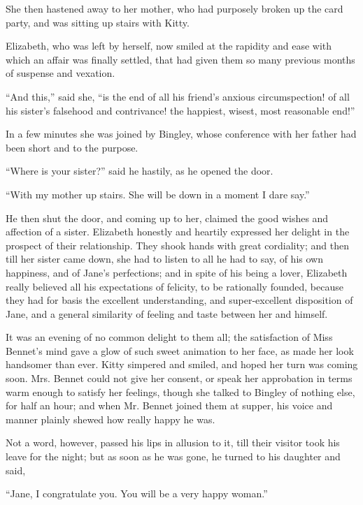 She then hastened away to her mother, who had purposely
broken up the card party, and was sitting up stairs
with Kitty.

Elizabeth, who was left by herself, now smiled at the
rapidity and ease with which an affair was finally settled,
that had given them so many previous months of suspense
and vexation.

“And this,” said she, “is the end of all his friend’s
anxious circumspection! of all his sister’s falsehood
and contrivance! the happiest, wisest, most reasonable
end!”

In a few minutes she was joined by Bingley, whose
conference with her father had been short and to the
purpose.

“Where is your sister?” said he hastily, as he opened
the door.

“With my mother up stairs. She will be down in a
moment I dare say.”

He then shut the door, and coming up to her, claimed
the good wishes and affection of a sister. Elizabeth
honestly and heartily expressed her delight in the prospect
of their relationship. They shook hands with great
cordiality; and then till her sister came down, she had
to listen to all he had to say, of his own happiness, and
of Jane’s perfections; and in spite of his being a lover,
Elizabeth really believed all his expectations of felicity,
to be rationally founded, because they had for basis the
excellent understanding, and super-excellent disposition
of Jane, and a general similarity of feeling and taste
between her and himself.

It was an evening of no common delight to them all;
the satisfaction of Miss Bennet’s mind gave a glow of
such sweet animation to her face, as made her look handsomer
than ever. Kitty simpered and smiled, and hoped
her turn was coming soon. Mrs. Bennet could not give
her consent, or speak her approbation in terms warm
enough to satisfy her feelings, though she talked to Bingley
of nothing else, for half an hour; and when Mr. Bennet
joined them at supper, his voice and manner plainly
shewed how really happy he was.

Not a word, however, passed his lips in allusion to it,
till their visitor took his leave for the night; but as soon
as he was gone, he turned to his daughter and said,

\begin{sloppypar}
“Jane, I congratulate you. You will be a very happy
woman.”
\end{sloppypar}

